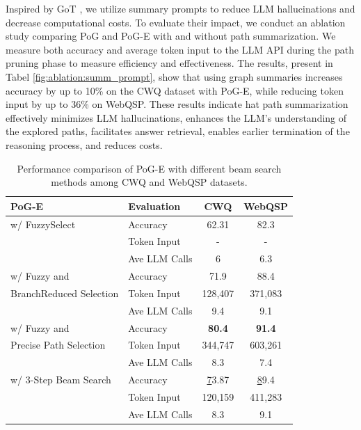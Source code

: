 \newpage
{} 
Inspired by GoT \cite{besta2024graphGoT}, we utilize summary prompts to reduce LLM hallucinations and decrease computational costs. To evaluate their impact, we conduct an ablation study comparing PoG and PoG-E with and without path summarization. We measure both accuracy and average token input to the LLM API during the path pruning phase to measure efficiency and effectiveness.
The results, present in Tabel \ref{fig:ablation:summ_prompt}, show that using graph summaries increases accuracy by up to 10\% on the CWQ dataset with PoG-E, while reducing token input by up to 36\% on WebQSP. These results indicate hat path summarization effectively minimizes LLM hallucinations, enhances the LLM's understanding of the explored paths, facilitates answer retrieval, enables earlier termination of the reasoning process, and reduces costs.
\begin{table}[h]

\caption{Performance comparison of PoG-E with different beam search methods among CWQ and WebQSP datasets.}\label{fig:ablation:vary_beamsearch_pog-e}
\begin{tabular}{@{}llcc@{}}
\toprule
\textbf{PoG-E}          & \textbf{Evaluation} & \textbf{CWQ}  & \textbf{WebQSP} \\ \midrule
w/ FuzzySelect          & Accuracy           & 62.31         & 82.3            \\
                        & Token Input         & -             & -               \\
                        & Ave LLM Calls       & 6             & 6.3             \\ \midrule
w/ Fuzzy and            & Accuracy           & 71.9          & 88.4            \\
BranchReduced Selection & Token Input         & 128,407       & 371,083         \\
                        & Ave LLM Calls       & 9.4           & 9.1             \\ \midrule
w/ Fuzzy and            & Accuracy           & \textbf{80.4} & \textbf{91.4}   \\
Precise Path Selection  & Token Input         & 344,747       & 603,261         \\
                        & Ave LLM Calls       & 8.3           & 7.4             \\ \midrule
w/ 3-Step Beam Search  & Accuracy           & {\ul 73.87}   & {\ul 89.4}      \\
                        & Token Input         & 120,159       & 411,283         \\
                        & Ave LLM Calls       & 8.3           & 9.1             \\ \bottomrule
\end{tabular}

\end{table}

